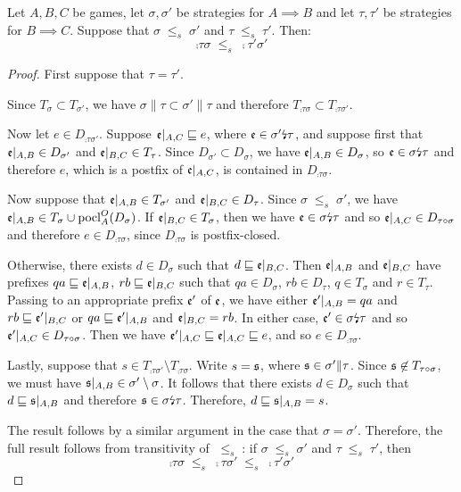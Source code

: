 \documentclass{article}
\newcommand{\stle}{{\;\le_s\;}}
\newcommand{\dv}{{\text{\lightning}}}
\DeclareMathOperator{\pocl}{pocl}
\begin{document}
\begin{proposition}
  Let $A,B,C$ be games, let $\sigma,\sigma'$ be strategies for $A\implies B$ and let $\tau,\tau'$ be strategies for $B\implies C$.  Suppose that $\sigma\stle\sigma'$ and $\tau\stle\tau'$.  Then:
  \[
    \comp\tau\sigma\stle\comp{\tau'}{\sigma'}
    \]
  \begin{proof}
    First suppose that $\tau=\tau'$.  

    Since $T_\sigma\subset T_{\sigma'}$, we have $\sigma\|\tau\subset\sigma'\|\tau$ and therefore $T_{\comp\tau\sigma}\subset T_{\comp{\tau}{\sigma'}}$.  

    Now let $e\in D_{\comp{\tau}{\sigma'}}$.  Suppose $\mathfrak e\vert_{A,C}\sqsubseteq e$, where $\e\in\sigma'\dv\tau$, and suppose first that $\mathfrak e\vert_{A,B}\in D_{\sigma'}$ and $\mathfrak e\vert_{B,C}\in T_{\tau}$.  Since $D_{\sigma'}\subset D_\sigma$, we have $\mathfrak e\vert_{A,B}\in D_\sigma$, so $\e\in\sigma\dv\tau$ and therefore $e$, which is a postfix of $\mathfrak e\vert_{A,C}$, is contained in $D_{\comp\tau\sigma}$.  
    
    Now suppose that $\mathfrak e\vert_{A,B}\in T_{\sigma'}$ and $\mathfrak e\vert_{B,C}\in D_{\tau}$.  Since $\sigma\stle\sigma'$, we have $\e\vert_{A,B}\in T_\sigma\cup \pocl_A^O(D_\sigma)$.  If $\mathfrak e\vert_{B,C}\in T_\sigma$, then we have $\e\in\sigma\dv\tau$ and so $\mathfrak e\vert_{A,C}\in D_{\tau \circ \sigma}$ and therefore $e\in D_{\comp\tau\sigma}$, since $D_{\comp\tau\sigma}$ is postfix-closed.  

    Otherwise, there exists $d\in D_\sigma$ such that $d\sqsubseteq\mathfrak e\vert_{B,C}$.  Then $\mathfrak e\vert_{A,B}$ and $\mathfrak e\vert_{B,C}$ have prefixes $qa\sqsubseteq\mathfrak e\vert_{A,B}$, $rb\sqsubseteq\mathfrak e\vert_{B,C}$ such that $qa\in D_\sigma$, $rb\in D_\tau$, $q\in T_\sigma$ and $r\in T_\tau$.  Passing to an appropriate prefix $\mathfrak e'$ of $\mathfrak e$, we have either $\mathfrak e'\vert_{A,B}=qa$ and $rb\sqsubseteq\mathfrak e'\vert_{B,C}$ or $qa\sqsubseteq\mathfrak e'\vert_{A,B}$ and $\mathfrak e\vert_{B,C}=rb$.  In either case, $\e'\in \sigma\dv\tau$ and so $\mathfrak e'\vert_{A,C}\in D_{\tau \circ \sigma}$.  Then we have $\mathfrak e'\vert_{A,C}\sqsubseteq\mathfrak e\vert_{A,C}\sqsubseteq e$, and so $e\in D_{\comp\tau\sigma}$.  

    Lastly, suppose that $s\in T_{\comp{\tau}{\sigma'}}\setminus T_{\comp\tau\sigma}$.  Write $s=\mathfrak s$, where $\mathfrak s\in\sigma'\|\tau$.  Since $\mathfrak s\not\in T_{\tau \circ \sigma}$, we must have $\mathfrak s\vert_{A,B}\in\sigma'\setminus\sigma$.  It follows that there exists $d\in D_\sigma$ such that $d\sqsubseteq\mathfrak s\vert_{A,B}$ and therefore $\s\in\sigma\dv\tau$.  Therefore, $d\sqsubseteq\mathfrak s\vert_{A,B} = s$.

    The result follows by a similar argument in the case that $\sigma=\sigma'$.  Therefore, the full result follows from transitivity of $\stle$: if $\sigma\stle\sigma'$ and $\tau\stle\tau'$, then
    \[
      \comp\tau\sigma \stle \comp\tau{\sigma'} \stle \comp{\tau'}{\sigma'}
      \]
  \end{proof}
\end{proposition}
\end{document}
